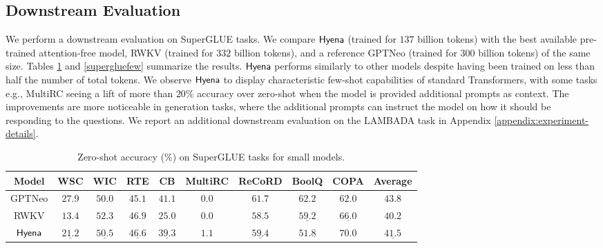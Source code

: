 \subsection{Downstream Evaluation}
%
We perform a downstream evaluation on SuperGLUE \citep{wang2019superglue} tasks. We compare ${\sf Hyena}$ (trained for $137$ billion tokens) with the best available pre-trained attention-free model, RWKV \citep{PENG_RWKV-LM_2021} (trained for $332$ billion tokens), and a reference GPTNeo \citep{gpt-neo} (trained for $300$ billion tokens) of the same size. Tables \ref{supergluezero} and \ref{supergluefew} summarize the results. ${\sf Hyena}$ performs similarly to other models despite having been trained on less than half the number of total tokens. We observe ${\sf Hyena}$ to display characteristic few-shot capabilities of standard Transformers, with some tasks e.g., MultiRC seeing a lift of more than $20\%$ accuracy over zero-shot when the model is provided additional prompts as context. The improvements are more noticeable in generation tasks, where the additional prompts can instruct the model on how it should be responding to the questions. We report an additional downstream evaluation on the LAMBADA  task \citep{paperno2016lambada} in Appendix \ref{appendix:experiment-details}.
%
\begin{table}[!h]
\small
\centering
\caption{Zero-shot accuracy ($\%$) on {\sc SuperGLUE} tasks for small models.}
\label{supergluezero}
\vspace{2mm}
\setlength{\tabcolsep}{4pt}
\begin{tabular}{@{}c|ccccccccc@{}}
\toprule
Model &\multicolumn{1}{c}{{\sc WSC}} & \multicolumn{1}{c}{{\sc WIC}} & \multicolumn{1}{c}{{\sc RTE}} & \multicolumn{1}{c}{{\sc CB}} & \multicolumn{1}{c}{{\sc MultiRC}} &  \multicolumn{1}{c}{{\sc ReCoRD}} &  \multicolumn{1}{c}{{\sc BoolQ}} &  \multicolumn{1}{c}{{\sc COPA}} & \multicolumn{1}{c}{{\sc Average}} \\
\midrule 
GPTNeo \citep{gpt-neo} & $\mathbf{27.9}$ & $50.0$ & $45.1$ & $\mathbf{41.1}$ & $0.0$ & $\mathbf{61.7}$ & $\mathbf{62.2}$ & $62.0$ & $\mathbf{43.8}$ \\ 
RWKV \citep{PENG_RWKV-LM_2021} & $13.4$ & $\mathbf{52.3}$ & $\mathbf{46.9}$ & $25.0$ & $0.0$ & $58.5$ & $\underline{59.2}$ & $\underline{66.0}$ & $40.2$ \\
${\sf Hyena}$ & $\underline{21.2}$ & $\underline{50.5}$ & $\underline{46.6}$ & $\underline{39.3}$ & $\mathbf{1.1}$ & $\underline{59.4}$ & $51.8$ & $\mathbf{70.0}$ & $\underline{41.5}$ \\
\bottomrule
\end{tabular}
\end{table}
